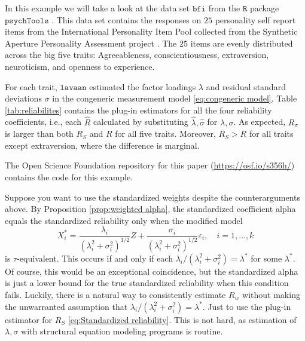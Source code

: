 \documentclass[twoside]{article}
\renewcommand{\sqrt}[1]{{(#1)^{1/2}}}
\begin{document}
\begin{example}
\label{exa:reliabilities}


In this example we will take a look at the data set $\texttt{bfi}$ from the $\texttt{R}$ \citep{Team2013-tt} package $\texttt{psychTools}$ \citep{Revelle2019-te}. This data set contains the responses on $25$ personality self report items from the International Personality Item Pool \citep{Goldberg1999-iz} collected from the Synthetic Aperture Personality Assessment project \citep{Revelle2017-ez}. The $25$ items are evenly distributed across the big five traits: Agreeableness, conscientiousness, extraversion, neuroticism, and openness to experience. 

For each trait, $\texttt{lavaan}$ \citep{Rosseel2012-yg} estimated the factor loadings $\lambda$ and residual standard deviations $\sigma$ in the congeneric measurement model \eqref{eq:congeneric model}. Table \ref{tab:reliabilites} contains the plug-in estimators for all the four reliability coefficients, i.e., each $\hat{ R}$ calculated by substituting $\hat{\lambda},\hat{\sigma}$ for $\lambda,\sigma$. As expected, $ R_\sigma$ is larger than both $ R_S$ and $ R$ for all five traits. Moreover, $ R_S >  R$ for all traits except extraversion, where the difference is marginal. 

The Open Science Foundation repository for this paper (\url{https://osf.io/s356h/}) contains the code for this example.
\end{example} 

Suppose you want to use the standardized weights despite the counterarguments above. By Proposition \ref{prop:weighted alpha}, the standardized coefficient alpha equals the standardized reliability only when the modified model
\begin{equation}\label{eq:std-modified model}
X_{i}^{*}=\frac{\lambda_{i}}{\sqrt{\lambda_{i}^{2}+\sigma_{i}^{2}}}Z+\frac{\sigma_{i}}{\sqrt{\lambda_{i}^{2}+\sigma_{i}^{2}}}\varepsilon_{i}, \quad i=1,\ldots,k    \end{equation}
is $\tau$-equivalent. This occurs if and only if each $\lambda_{i}/(\lambda_{i}^{2}+\sigma_{i}^{2})=\lambda^{*}$
for some $\lambda^{*}$. Of course, this would be an exceptional coincidence, but the standardized alpha is just a lower bound for the true standardized reliability when this condition fails. Luckily, there is a natural way to consistently estimate $ R_w$ without making the unwarranted assumption that $\lambda_{i}/(\lambda_{i}^{2}+\sigma_{i}^{2})=\lambda^{*}$. Just to use the plug-in estimator for $ R_S$ \eqref{eq:Standardized reliability}. This is not hard, as estimation of $\lambda,\sigma$ with structural equation modeling programs is routine. 
\end{document}

